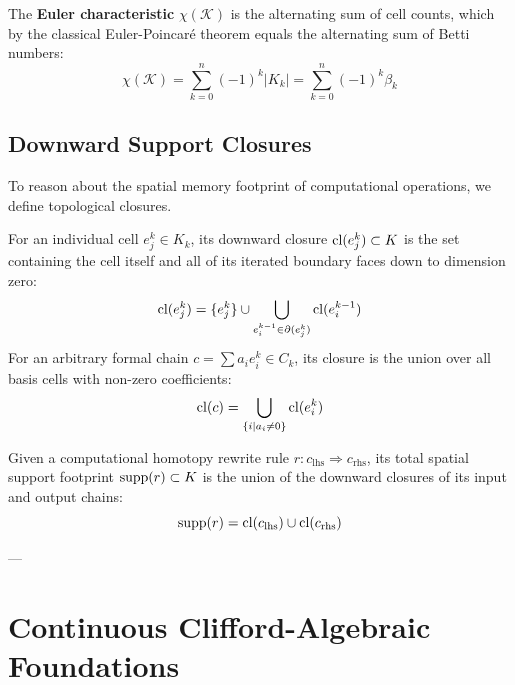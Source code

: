 \begin{definition}
The \textbf{Euler characteristic} $\chi(\mathcal{K})$ is the alternating sum of cell counts, which by the classical Euler-Poincaré theorem equals the alternating sum of Betti numbers:
\begin{equation}
    \chi(\mathcal{K}) = \sum_{k=0}^n (-1)^k |K_k| = \sum_{k=0}^n (-1)^k \beta_k
\end{equation}
\end{definition}

\subsection{Downward Support Closures}
To reason about the spatial memory footprint of computational operations, we define topological closures.

\begin{definition}
For an individual cell $e_j^k \in K_k$, its downward closure $\operatorname{cl}(e_j^k) \subset K$ is the set containing the cell itself and all of its iterated boundary faces down to dimension zero:
\begin{equation}
    \operatorname{cl}(e_j^k) = \{ e_j^k \} \cup \bigcup_{e_i^{k-1} \in \partial(e_j^k)} \operatorname{cl}(e_i^{k-1})
\end{equation}
For an arbitrary formal chain $c = \sum a_i e_i^k \in C_k$, its closure is the union over all basis cells with non-zero coefficients:
\begin{equation}
    \operatorname{cl}(c) = \bigcup_{\{i \mid a_i \neq 0\}} \operatorname{cl}(e_i^k)
\end{equation}
\end{definition}

\begin{definition}
Given a computational homotopy rewrite rule $r : c_{\text{lhs}} \Rightarrow c_{\text{rhs}}$, its total spatial support footprint $\operatorname{supp}(r) \subset K$ is the union of the downward closures of its input and output chains:
\begin{equation}
    \operatorname{supp}(r) = \operatorname{cl}(c_{\text{lhs}}) \cup \operatorname{cl}(c_{\text{rhs}})
\end{equation}
\end{definition}

---

\section{Continuous Clifford-Algebraic Foundations}
\label{sec:continuous_clifford}

